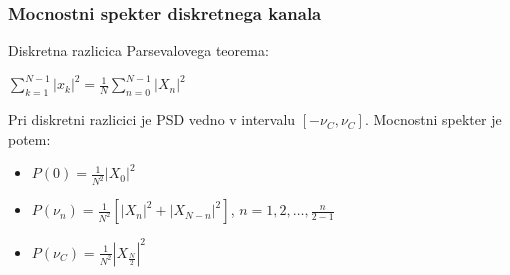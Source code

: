 \documentclass{article}
\begin{document}
\begin{multicols}{4}
\subsubsection{Mocnostni spekter diskretnega kanala}
Diskretna razlicica Parsevalovega teorema:
\begin{center}
    \begin{math}
        \sum_{k=1}^{N-1} |x_k|^2 = \frac{1}{N} \sum_{n=0}^{N-1} |X_n|^2
    \end{math}
\end{center}
Pri diskretni razlicici je PSD vedno v intervalu $[- \nu_C, \nu_C]$.
Mocnostni spekter je potem:
\begin{itemize}
    \item $P(0) = \frac{1}{N^2} |X_0|^2$
    \item $P(\nu_n) = \frac{1}{N^2} [|X_n|^2 + |X_{N-n}|^2]$, $n = 1, 2, \dots, \frac{n}{2-1}$
    \item $P(\nu_C) = \frac{1}{N^2}|X_{\frac{N}{2}}|^2$
\end{itemize}

\end{multicols}
\end{document}
